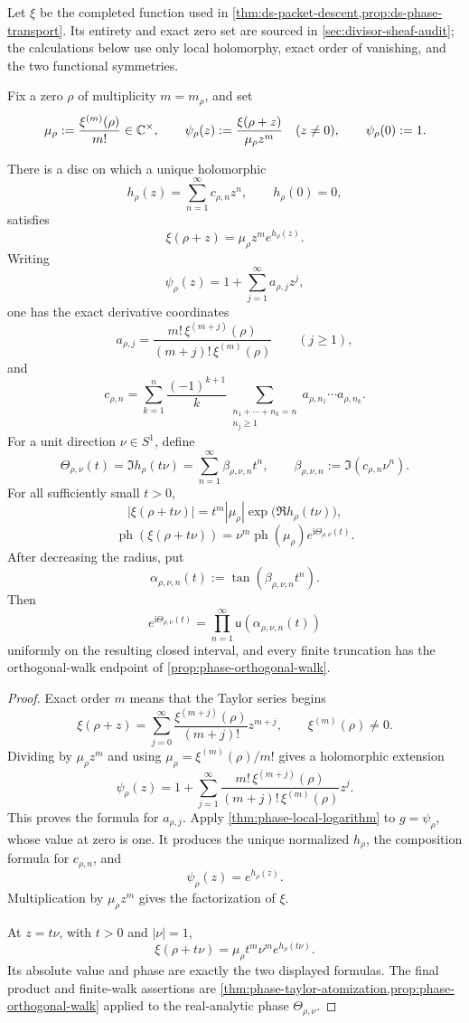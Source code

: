 Let \(\xi\) be the completed function used in
\cref{thm:ds-packet-descent,prop:ds-phase-transport}.  Its entirety and exact
zero set are sourced in \cref{sec:divisor-sheaf-audit}; the calculations below
use only local holomorphy, exact order of vanishing, and the two functional
symmetries.

Fix a zero \(\rho\) of multiplicity \(m=m_\rho\), and set
\[
 \mu_\rho:=\frac{\xi^{(m)}(\rho)}{m!}\in\mathbb C^\times,
\qquad
 \psi_\rho(z):=
 \frac{\xi(\rho+z)}{\mu_\rho z^m}
\quad(z\ne0),
\qquad
 \psi_\rho(0):=1.
\]

\begin{theorem}
\label{thm:phase-local-packet}
There is a disc on which a unique holomorphic
\[
 h_\rho(z)=\sum_{n=1}^{\infty}c_{\rho,n}z^n,
\qquad h_\rho(0)=0,
\]
satisfies
\[
 \xi(\rho+z)=\mu_\rho z^m e^{h_\rho(z)}.
\]
Writing
\[
 \psi_\rho(z)=1+\sum_{j=1}^{\infty}a_{\rho,j}z^j,
\]
one has the exact derivative coordinates
\[
 a_{\rho,j}
 =
 \frac{m!\,\xi^{(m+j)}(\rho)}
 {(m+j)!\,\xi^{(m)}(\rho)}
\qquad(j\geq1),
\]
and
\[
 c_{\rho,n}
 =
 \sum_{k=1}^n\frac{(-1)^{k+1}}{k}
 \sum_{\substack{n_1+\cdots+n_k=n\\n_j\geq1}}
 a_{\rho,n_1}\cdots a_{\rho,n_k}.
\]
For a unit direction \(\nu\in S^1\), define
\[
 \Theta_{\rho,\nu}(t)
 =
 \Im h_\rho(t\nu)
 =
 \sum_{n=1}^{\infty}\beta_{\rho,\nu,n}t^n,
\qquad
 \beta_{\rho,\nu,n}:=\Im(c_{\rho,n}\nu^n).
\]
For all sufficiently small \(t>0\),
\[
 |\xi(\rho+t\nu)|
 =
 t^m|\mu_\rho|
 \exp\bigl(\Re h_\rho(t\nu)\bigr),
\]
\[
 \operatorname{ph}(\xi(\rho+t\nu))
 =
 \nu^m\operatorname{ph}(\mu_\rho)
 e^{\mathrm i\Theta_{\rho,\nu}(t)}.
\]
After decreasing the radius, put
\[
 \alpha_{\rho,\nu,n}(t)
 :=
 \tan(\beta_{\rho,\nu,n}t^n).
\]
Then
\[
 e^{\mathrm i\Theta_{\rho,\nu}(t)}
 =
 \prod_{n=1}^{\infty}
 \mathsf u(\alpha_{\rho,\nu,n}(t))
\]
uniformly on the resulting closed interval, and every finite truncation has the
orthogonal-walk endpoint of
\cref{prop:phase-orthogonal-walk}.
\end{theorem}

\begin{proof}
Exact order \(m\) means that the Taylor series begins
\[
 \xi(\rho+z)
 =
 \sum_{j=0}^{\infty}
 \frac{\xi^{(m+j)}(\rho)}{(m+j)!}z^{m+j},
\qquad
 \xi^{(m)}(\rho)\ne0.
\]
 Dividing by \(\mu_\rho z^m\) and using
 \(\mu_\rho=\xi^{(m)}(\rho)/m!\) gives a holomorphic extension
\[
 \psi_\rho(z)
 =
 1+
 \sum_{j=1}^{\infty}
 \frac{m!\,\xi^{(m+j)}(\rho)}
 {(m+j)!\,\xi^{(m)}(\rho)}z^j.
\]
This proves the formula for \(a_{\rho,j}\).  Apply
\cref{thm:phase-local-logarithm} to \(g=\psi_\rho\), whose value at zero is one.
It produces the unique normalized \(h_\rho\), the composition formula for
\(c_{\rho,n}\), and
\[
 \psi_\rho(z)=e^{h_\rho(z)}.
\]
 Multiplication by \(\mu_\rho z^m\) gives the factorization of \(\xi\).

At \(z=t\nu\), with \(t>0\) and \(|\nu|=1\),
\[
 \xi(\rho+t\nu)
 =
 \mu_\rho t^m\nu^m e^{h_\rho(t\nu)}.
\]
Its absolute value and phase are exactly the two displayed formulas.  The final
product and finite-walk assertions are
\cref{thm:phase-taylor-atomization,prop:phase-orthogonal-walk} applied to the
real-analytic phase \(\Theta_{\rho,\nu}\).
\end{proof}

